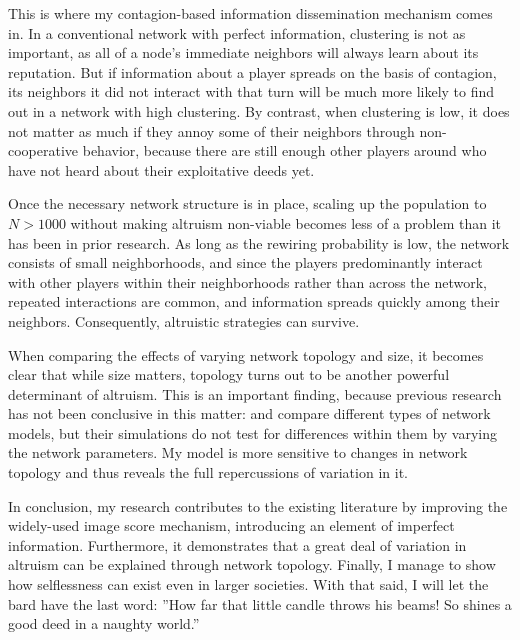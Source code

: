 \documentclass{JASSS}
\begin{document}
This is where my contagion-based information dissemination mechanism comes in. In a conventional network with perfect information, clustering is not as important, as all of a node's immediate neighbors will always learn about its reputation. But if information about a player spreads on the basis of contagion, its neighbors it did not interact with that turn will be much more likely to find out in a network with high clustering. By contrast, when clustering is low, it does not matter as much if they annoy some of their neighbors through non-cooperative behavior, because there are still enough other players around who have not heard about their exploitative deeds yet.

Once the necessary network structure is in place, scaling up the population to $N>1000$ without making altruism non-viable becomes less of a problem than it has been in prior research. As long as the rewiring probability is low, the network consists of small neighborhoods, and since the players predominantly interact with other players within their neighborhoods rather than across the network, repeated interactions are common, and information spreads quickly among their neighbors. Consequently, altruistic strategies can survive.

When comparing the effects of varying network topology and size, it becomes clear that while size matters, topology turns out to be another powerful determinant of altruism. This is an important finding, because previous research has not been conclusive in this matter: \cite{Santos2008} and \cite{Peleteiro2014} compare different types of network models, but their simulations do not test for differences within them by varying the network parameters. My model is more sensitive to changes in network topology and thus reveals the full repercussions of variation in it.

In conclusion, my research contributes to the existing literature by improving the widely-used image score mechanism, introducing an element of imperfect information. Furthermore, it demonstrates that a great deal of variation in altruism can be explained through network topology. Finally, I manage to show how selflessness can exist even in larger societies. With that said, I will let the bard \citep{Shakespeare} have the last word: ''How far that little candle throws his beams! So shines a good deed in a naughty world.''

\end{document}
